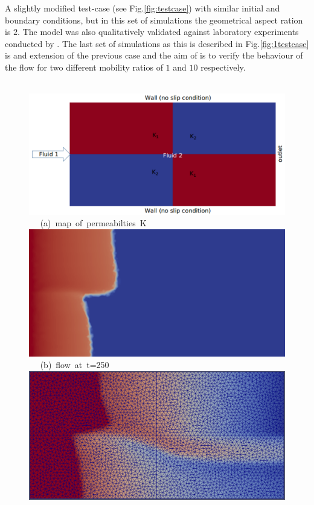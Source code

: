 \documentclass[preprint,authoryear,12pt]{elsarticle}
\begin{document}
\medskip
A slightly modified test-case (see Fig.\ref{fig:testcase}) with similar initial and boundary conditions, but in this set of simulations the geometrical aspect ration is $2$. The model was also qualitatively validated against laboratory experiments conducted by \citet{evans_1994}. The last set of simulations as this is described in Fig.\ref{fig:1testcase} is and extension of the previous case and the aim of is to verify the behaviour of the flow for two different mobility ratios of $1$ and $10$ respectively.

\begin{figure}[h]
\vbox{
\hbox{\hspace{1.5cm}
\includegraphics[width=.75\textwidth]{./Pics1/2b2_wi_fine/2b2_whole_in_fine_perm_1.pdf} 
}
\vspace{0.0cm}
\hbox{\hspace{5.0cm} (a) map of permeabilties K  
}
\vspace{0.25cm}
\hbox{\hspace{1.5cm}
\includegraphics[width=.75\textwidth]{./Pics1/2b2_wi_fine/2b2_whole_in_fine_250_2.pdf}
}
\vspace{0.0cm}
\hbox{\hspace{5.0cm} (b) flow at t=250  
}
\vspace{0.25cm}
\hbox{\hspace{1.5cm}
\includegraphics[width=.75\textwidth]{./Pics1/2b2_wi_fine/2b2_whole_in_fine_3000_1.pdf}
}}
\end{figure}
\end{document}
